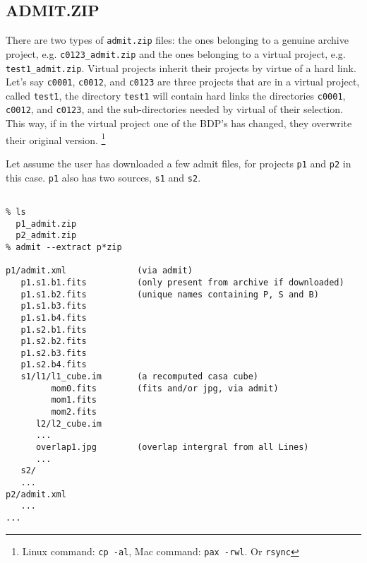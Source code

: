 \documentclass{article}
\begin{document}
\subsection{ADMIT.ZIP}


There are two types of {\tt admit.zip} files: the ones belonging to a
genuine archive project, e.g.  {\tt c0123\_admit.zip} and the ones
belonging to a virtual project, e.g.  {\tt test1\_admit.zip}.  Virtual
projects inherit their projects by virtue of a hard link. Let's say
{\tt c0001}, {\tt c0012}, and {\tt c0123} are three projects that are
in a virtual project, called {\tt test1}, the directory {\tt test1}
will contain hard links the directories {\tt c0001}, {\tt c0012}, and
{\tt c0123}, and the sub-directories needed by virtual of their selection.
 This way, if in the virtual project one of the BDP's has
changed, they overwrite their original version. 
\footnote{Linux command: {\tt cp -al}, Mac command: {\tt pax -rwl}. Or {\tt rsync}}

Let assume the user has downloaded a few admit files, for projects 
{\tt p1} and {\tt p2} in this case. {\tt p1} also has two sources,
{\tt s1} and {\tt s2}.

\footnotesize
\begin{verbatim}

% ls
  p1_admit.zip
  p2_admit.zip
% admit --extract p*zip

p1/admit.xml              (via admit)
   p1.s1.b1.fits          (only present from archive if downloaded)
   p1.s1.b2.fits          (unique names containing P, S and B)
   p1.s1.b3.fits
   p1.s1.b4.fits
   p1.s2.b1.fits
   p1.s2.b2.fits
   p1.s2.b3.fits
   p1.s2.b4.fits
   s1/l1/l1_cube.im       (a recomputed casa cube)
         mom0.fits        (fits and/or jpg, via admit)
         mom1.fits
         mom2.fits
      l2/l2_cube.im
      ...
      overlap1.jpg        (overlap intergral from all Lines)
      ...
   s2/
   ...
p2/admit.xml
   ...
...

\end{verbatim}
\normalsize
\end{document}
